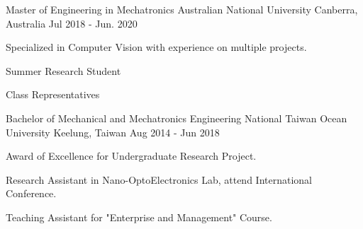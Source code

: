 

\begin{cventries}

  \cventry
    {Master of Engineering in Mechatronics} %
    {Australian National University} %
    {Canberra, Australia} %
    {Jul 2018 - Jun. 2020} %
    {
      \begin{cvitems} %
        \item {Specialized in Computer Vision with experience on multiple projects.}
        \item {Summer Research Student}
        \item {Class Representatives}
      \end{cvitems}
    }
  \cventry
    {Bachelor of Mechanical and Mechatronics Engineering}
    {National Taiwan Ocean University}
    {Keelung, Taiwan}
    {Aug 2014 - Jun 2018}
    {
      \begin{cvitems}
        \item {Award of Excellence for Undergraduate Research Project.}
        \item {Research Assistant in Nano-OptoElectronics Lab, attend International Conference.}
        \item {Teaching Assistant for "Enterprise and Management" Course.}
      \end{cvitems}
    }
\end{cventries}
